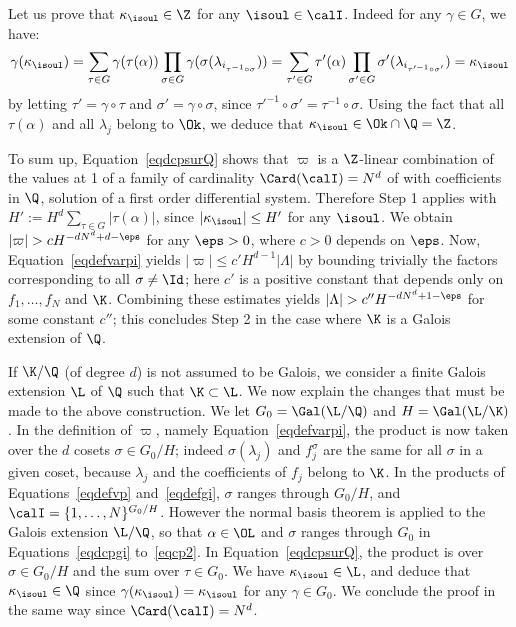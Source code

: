 Let us prove that $\kappa_{\isoul}\in \Z$ for any $ \isoul\in\calI$. Indeed for any $\gamma\in G$, we have:
\[
\gamma(\kappa_\isoul) = \sum_{\tau\in G}\gamma(\tau(\alpha)) \prod_{\sigma\in G} \gamma(\sigma(\lambda_{i_{\tau^{-1}\circ\sigma}}))
= \sum_{\tau'\in G}\tau'(\alpha)\prod_{\sigma'\in G} \sigma'(\lambda_{i_{\tau'^{-1}\circ\sigma'}}) = \kappa_{\isoul}
\]
by letting $ \tau' = \gamma\circ\tau$ and $\sigma'=\gamma\circ\sigma$, since $\tau'^{-1}\circ\sigma' = \tau^{-1}\circ\sigma$.
Using the fact that all $\tau(\alpha)$ and all $\lambda_j$ belong to $\Ok$, we deduce that $\kappa_\isoul\in \Ok\cap\Q=\Z$.

To sum up, Equation~\eqref{eqdcpsurQ} shows that $\varpi$ is a $\Z$-linear combination of the values at 1 of a family of cardinality $\Card ( \calI ) = N^d$ of \Efunctions with coefficients in $\Q$, solution of a first order differential system. Therefore Step 1 applies with $H' := H^d \sum_{\tau\in G}|\tau(\alpha)|$, since $|\kappa_\isoul|\leq H'$ for any $\isoul$. We obtain $| \varpi | > c H^{-dN^d+d-\eps}$ for any $\eps>0$, where $c>0$ depends on $\eps$.
Now, Equation~\eqref{eqdefvarpi} yields $| \varpi | \leq c' H^{d-1} |\Lambda|$ by bounding trivially the factors corresponding to all $\sigma\neq\Id$; here $c'$ is a positive constant that depends only on $f_1,\ldots,f_N$ and $\K$. Combining these estimates yields $|\Lambda|> c'' H^{- dN^d +1-\eps } $ for some constant $c''$; this concludes Step 2 in the case where $\K$ is a Galois extension of $\Q$.

If $\K/\Q$ (of degree $d$) is not assumed to be Galois, we consider a finite Galois extension $\L$ of $\Q$ such that $\K\subset \L$. We now explain the changes that must be made to the above construction. We let $G_0=\Gal(\L/\Q)$ and $H=\Gal(\L/\K)$. In the definition of $\varpi$, namely Equation~\eqref{eqdefvarpi}, the product is now taken over the $d$ cosets $\sigma\in G_0/H$; indeed $\sigma(\lambda_j)$ and $f_j^\sigma$ are the same for all $\sigma$ in a given coset, because $\lambda_j$ and the coefficients of $f_j$ belong to $\K$.
In the products of Equations~\eqref{eqdefvp} and~\eqref{eqdefgi}, $\sigma$ ranges through $G_0/H$, and $\calI = \{1,\ldots,N\}^{ G_0/H }$. However the normal basis theorem is applied to the Galois extension $\L/\Q$, so that $\alpha\in\OL$ and $\sigma$ ranges through $G_0$ in Equations~\eqref{eqdcpgi} to~\eqref{eqcp2}. In Equation~\eqref{eqdcpsurQ}, the product is over $\sigma\in G_0/H$ and the sum over $\tau\in G_0$. We have $\kappa_{\isoul}\in \L$, and deduce that $\kappa_{\isoul}\in \Q$ since $\gamma(\kappa_{\isoul}) = \kappa_{\isoul}$ for any $\gamma\in G_0$. We conclude the proof in the same way since $\Card(\calI)=N^d$.

